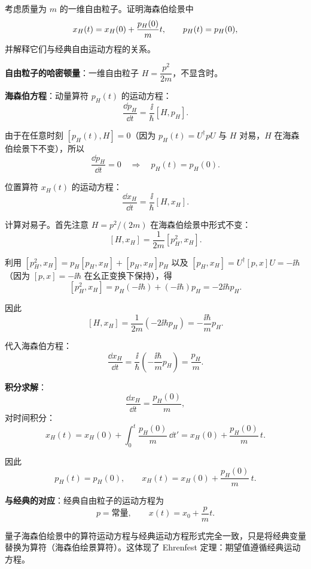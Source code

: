 \begin{question}
考虑质量为 $m$ 的一维自由粒子。证明海森伯绘景中
\[
x_H(t)=x_H(0)+{p_H(0)\over m}t,
\qquad
p_H(t)=p_H(0),
\]
并解释它们与经典自由运动方程的关系。
\end{question}
\begin{solution}
	\textbf{自由粒子的哈密顿量}：一维自由粒子 $H = \dfrac{p^2}{2m}$，不显含时。

	\textbf{海森伯方程}：动量算符 $p_H(t)$ 的运动方程：
	\[
	\frac{\dd p_H}{\dd t} = \frac{\ii}{\hbar}[H,p_H].
	\]

	由于在任意时刻 $[p_H(t),H]=0$（因为 $p_H(t)=U^\dagger p U$ 与 $H$ 对易，$H$ 在海森伯绘景下不变），所以
	\[
	\frac{\dd p_H}{\dd t} = 0 \quad\Longrightarrow\quad p_H(t) = p_H(0).
	\]

	位置算符 $x_H(t)$ 的运动方程：
	\[
	\frac{\dd x_H}{\dd t} = \frac{\ii}{\hbar}[H,x_H].
	\]

	计算对易子。首先注意 $H=p^2/(2m)$ 在海森伯绘景中形式不变：
	\[
	[H,x_H] = \frac{1}{2m}[p_H^2,x_H].
	\]

	利用 $[p_H^2,x_H] = p_H[p_H,x_H] + [p_H,x_H]p_H$ 以及 $[p_H,x_H] = U^\dagger[p,x]U = -\ii\hbar$（因为 $[p,x]=-\ii\hbar$ 在幺正变换下保持），得
	\[
	[p_H^2,x_H] = p_H(-\ii\hbar) + (-\ii\hbar)p_H = -2\ii\hbar p_H.
	\]

	因此
	\[
	[H,x_H] = \frac{1}{2m}(-2\ii\hbar p_H) = -\frac{\ii\hbar}{m}p_H.
	\]

	代入海森伯方程：
	\[
	\frac{\dd x_H}{\dd t} = \frac{\ii}{\hbar}\left(-\frac{\ii\hbar}{m}p_H\right) = \frac{p_H}{m}.
	\]

	\textbf{积分求解}：
	\[
	\frac{\dd x_H}{\dd t} = \frac{p_H(0)}{m},
	\]
	对时间积分：
	\[
	x_H(t) = x_H(0) + \int_0^t \frac{p_H(0)}{m}\,\dd t' = x_H(0) + \frac{p_H(0)}{m}\,t.
	\]

	因此
	\[
	\boxed{p_H(t) = p_H(0)},\qquad
	\boxed{x_H(t) = x_H(0) + \frac{p_H(0)}{m}\,t}.
	\]

	\textbf{与经典的对应}：经典自由粒子的运动方程为
	\[
	p = \text{常量},\qquad x(t) = x_0 + \frac{p}{m}t.
	\]

	量子海森伯绘景中的算符运动方程与经典运动方程形式完全一致，只是将经典变量替换为算符（海森伯绘景算符）。这体现了 Ehrenfest 定理：期望值遵循经典运动方程。
	\end{solution}

